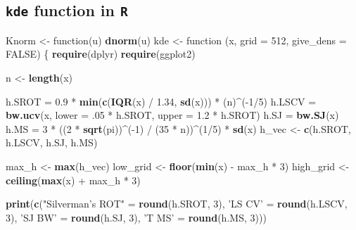 \documentclass[]{article}
\newenvironment{Shaded}{\begin{snugshade}}{\end{snugshade}}
\newcommand{\KeywordTok}[1]{\textcolor[rgb]{0.13,0.29,0.53}{\textbf{{#1}}}}
\newcommand{\DataTypeTok}[1]{\textcolor[rgb]{0.13,0.29,0.53}{{#1}}}
\newcommand{\DecValTok}[1]{\textcolor[rgb]{0.00,0.00,0.81}{{#1}}}
\newcommand{\FloatTok}[1]{\textcolor[rgb]{0.00,0.00,0.81}{{#1}}}
\newcommand{\StringTok}[1]{\textcolor[rgb]{0.31,0.60,0.02}{{#1}}}
\newcommand{\OtherTok}[1]{\textcolor[rgb]{0.56,0.35,0.01}{{#1}}}
\newcommand{\NormalTok}[1]{{#1}}
\begin{document}
\subsection{\texorpdfstring{\texttt{kde} function in
\texttt{R}}{kde function in R}}\label{kde-function-in-r}

\begin{Shaded}
\begin{Highlighting}[]
\NormalTok{Knorm <-}\StringTok{ }\NormalTok{function(u) }\KeywordTok{dnorm}\NormalTok{(u)}
\NormalTok{kde <-}\StringTok{ }\NormalTok{function (x, }\DataTypeTok{grid =} \DecValTok{512}\NormalTok{, }\DataTypeTok{give_dens =} \OtherTok{FALSE}\NormalTok{) }
\NormalTok{\{}
    \KeywordTok{require}\NormalTok{(dplyr)}
    \KeywordTok{require}\NormalTok{(ggplot2)}
    
    \NormalTok{n <-}\StringTok{ }\KeywordTok{length}\NormalTok{(x)}
    
    \NormalTok{h.SROT =}\StringTok{ }\FloatTok{0.9} \NormalTok{*}\StringTok{ }\KeywordTok{min}\NormalTok{(}\KeywordTok{c}\NormalTok{(}\KeywordTok{IQR}\NormalTok{(x) /}\StringTok{ }\FloatTok{1.34}\NormalTok{, }\KeywordTok{sd}\NormalTok{(x))) *}\StringTok{ }\NormalTok{(n)^(-}\DecValTok{1}\NormalTok{/}\DecValTok{5}\NormalTok{)}
    \NormalTok{h.LSCV =}\StringTok{ }\KeywordTok{bw.ucv}\NormalTok{(x, }\DataTypeTok{lower =} \NormalTok{.}\DecValTok{05} \NormalTok{*}\StringTok{ }\NormalTok{h.SROT, }\DataTypeTok{upper =} \FloatTok{1.2} \NormalTok{*}\StringTok{ }\NormalTok{h.SROT)}
    \NormalTok{h.SJ =}\StringTok{ }\KeywordTok{bw.SJ}\NormalTok{(x)}
    \NormalTok{h.MS =}\StringTok{ }\DecValTok{3} \NormalTok{*}\StringTok{ }\NormalTok{((}\DecValTok{2} \NormalTok{*}\StringTok{ }\KeywordTok{sqrt}\NormalTok{(pi))^(-}\DecValTok{1}\NormalTok{) /}\StringTok{ }\NormalTok{(}\DecValTok{35} \NormalTok{*}\StringTok{ }\NormalTok{n))^(}\DecValTok{1}\NormalTok{/}\DecValTok{5}\NormalTok{) *}\StringTok{ }\KeywordTok{sd}\NormalTok{(x)}
    \NormalTok{h_vec <-}\StringTok{ }\KeywordTok{c}\NormalTok{(h.SROT, h.LSCV, h.SJ, h.MS)}
    
    \NormalTok{max_h <-}\StringTok{ }\KeywordTok{max}\NormalTok{(h_vec)}
    \NormalTok{low_grid <-}\StringTok{ }\KeywordTok{floor}\NormalTok{(}\KeywordTok{min}\NormalTok{(x) -}\StringTok{ }\NormalTok{max_h *}\StringTok{ }\DecValTok{3}\NormalTok{)}
    \NormalTok{high_grid <-}\StringTok{ }\KeywordTok{ceiling}\NormalTok{(}\KeywordTok{max}\NormalTok{(x) +}\StringTok{ }\NormalTok{max_h *}\StringTok{ }\DecValTok{3}\NormalTok{)}
    
    
    \KeywordTok{print}\NormalTok{(}\KeywordTok{c}\NormalTok{(}\StringTok{"Silverman's ROT"} \NormalTok{=}\StringTok{ }\KeywordTok{round}\NormalTok{(h.SROT, }\DecValTok{3}\NormalTok{), }
            \StringTok{'LS CV'} \NormalTok{=}\StringTok{ }\KeywordTok{round}\NormalTok{(h.LSCV, }\DecValTok{3}\NormalTok{),}
            \StringTok{'SJ BW'} \NormalTok{=}\StringTok{ }\KeywordTok{round}\NormalTok{(h.SJ, }\DecValTok{3}\NormalTok{),}
            \StringTok{'T MS'} \NormalTok{=}\StringTok{ }\KeywordTok{round}\NormalTok{(h.MS, }\DecValTok{3}\NormalTok{)))}
    

\end{Highlighting}
\end{Shaded}
\end{document}
